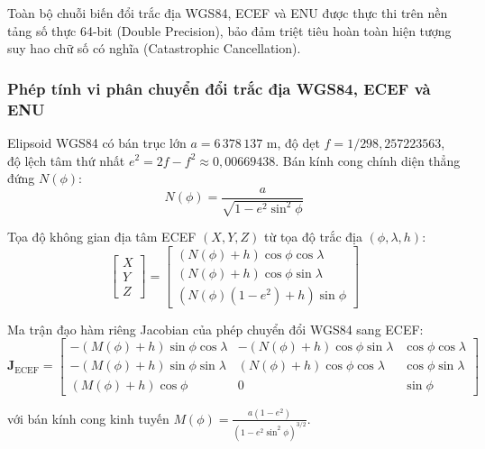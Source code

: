 Toàn bộ chuỗi biến đổi trắc địa WGS84, ECEF và ENU được thực thi trên nền tảng số thực 64-bit (Double Precision), bảo đảm triệt tiêu hoàn toàn hiện tượng suy hao chữ số có nghĩa (Catastrophic Cancellation).

\subsubsection{Phép tính vi phân chuyển đổi trắc địa WGS84, ECEF và ENU}

\hspace{0.5cm} Elipsoid WGS84 có bán trục lớn $a = 6\,378\,137$ m, độ dẹt $f = 1/298{,}257223563$, độ lệch tâm thứ nhất $e^2 = 2f - f^2 \approx 0{,}00669438$. Bán kính cong chính diện thẳng đứng $N(\phi)$:
\begin{equation}
N(\phi) = \frac{a}{\sqrt{1 - e^2 \sin^2\phi}}
\label{eq:prime-vertical-curvature-w15}
\end{equation}

Tọa độ không gian địa tâm ECEF $(X, Y, Z)$ từ tọa độ trắc địa $(\phi, \lambda, h)$:
\begin{equation}
\begin{bmatrix} X \\ Y \\ Z \end{bmatrix} = \begin{bmatrix}
(N(\phi) + h) \cos\phi \cos\lambda \\
(N(\phi) + h) \cos\phi \sin\lambda \\
(N(\phi)(1 - e^2) + h) \sin\phi
\end{bmatrix}
\label{eq:wgs84-to-ecef-formula}
\end{equation}

Ma trận đạo hàm riêng Jacobian của phép chuyển đổi WGS84 sang ECEF:
\begin{equation}
\mathbf{J}_{\text{ECEF}} = \begin{bmatrix}
-(M(\phi) + h)\sin\phi \cos\lambda & -(N(\phi) + h)\cos\phi \sin\lambda & \cos\phi \cos\lambda \\
-(M(\phi) + h)\sin\phi \sin\lambda & (N(\phi) + h)\cos\phi \cos\lambda & \cos\phi \sin\lambda \\
(M(\phi) + h)\cos\phi & 0 & \sin\phi
\end{bmatrix}
\label{eq:wgs84-to-ecef-jacobian}
\end{equation}

với bán kính cong kinh tuyến $M(\phi) = \frac{a(1 - e^2)}{(1 - e^2 \sin^2\phi)^{3/2}}$.

